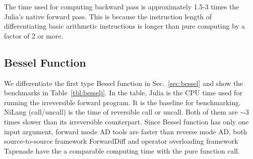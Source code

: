 \documentclass{article}
\newcommand{\<}{\langle}
\renewcommand{\>}{\rangle}
\newcommand{\Tbl}[1]{Table~\ref{#1}}
\newcommand{\Sec}[1]{Sec.~\ref{#1}}
\newcommand{\ra}[1]{\renewcommand{\arraystretch}{#1}}
\theoremstyle{definition}\newtheorem{definition}{\textit{Definition}}
\begin{document}
The time used for computing backward pass is approximately 1.5-3 times the Julia's native forward pass.
This is because the instruction length of differentiating basic arithmetic instructions is longer than pure computing by a factor of 2 or more.


\subsection{Bessel Function}
We differentiate the first type Bessel function in \Sec{sec:bessel} and show the benchmarks in \Tbl{tbl:besselj}.
In the table, Julia is the CPU time used for running the irreversible forward program. It is the baseline for benchmarking.
NiLang (call/uncall) is the time of reversible call or uncall. Both of them are $\sim3$ times slower than its irreversible counterpart. Since Bessel function has only one input argument, forward mode AD tools are faster than reverse mode AD, both source-to-source framework ForwardDiff and operator overloading framework Tapenade have the a comparable computing time with the pure function call.
\begin{table}[h!]\centering
\begin{minipage}{0.8\columnwidth}
\ra{1.3}
    \caption{Time and space used for computing objective (O) and gradient (G) of the first kind Bessel function $J_2(1.0)$.
    The CUDA time is averaged over a batch size of 4000, which is not a fair comparison but shows how much performance can we get from GPU in the parallel computing context.
}\label{tbl:besselj}
\end{minipage}
\end{table}
\end{document}
